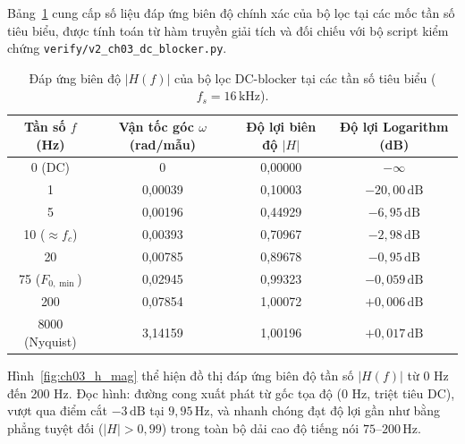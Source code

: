 Bảng~\ref{tab:ch03_h_mag} cung cấp số liệu đáp ứng biên độ chính xác của bộ lọc tại các mốc tần số tiêu biểu, được tính toán từ hàm truyền giải tích và đối chiếu với bộ script kiểm chứng \texttt{verify/v2\_ch03\_dc\_blocker.py}.

\begin{table}[H]
\centering
\small
\caption{Đáp ứng biên độ $|H(f)|$ của bộ lọc DC-blocker tại các tần số tiêu biểu ($f_s = 16\,\text{kHz}$).}
\label{tab:ch03_h_mag}
\begin{tabular}{@{}cccc@{}}
\toprule
Tần số $f$ (Hz) & Vận tốc góc $\omega$ (rad/mẫu) & Độ lợi biên độ $|H|$ & Độ lợi Logarithm (dB) \\
\midrule
0 (DC) & 0 & 0{,}00000 & $-\infty$ \\
1 & 0{,}00039 & 0{,}10003 & $-20{,}00\,\text{dB}$ \\
5 & 0{,}00196 & 0{,}44929 & $-6{,}95\,\text{dB}$ \\
10 ($\approx f_c$) & 0{,}00393 & 0{,}70967 & $-2{,}98\,\text{dB}$ \\
20 & 0{,}00785 & 0{,}89678 & $-0{,}95\,\text{dB}$ \\
75 ($F_{0,\min}$) & 0{,}02945 & 0{,}99323 & $-0{,}059\,\text{dB}$ \\
200 & 0{,}07854 & 1{,}00072 & $+0{,}006\,\text{dB}$ \\
8000 (Nyquist) & 3{,}14159 & 1{,}00196 & $+0{,}017\,\text{dB}$ \\
\bottomrule
\end{tabular}
\end{table}

Hình~\ref{fig:ch03_h_mag} thể hiện đồ thị đáp ứng biên độ tần số $|H(f)|$ từ 0 Hz đến 200 Hz. Đọc hình: đường cong xuất phát từ gốc tọa độ (0 Hz, triệt tiêu DC), vượt qua điểm cắt $-3\,\text{dB}$ tại $9{,}95\,\text{Hz}$, và nhanh chóng đạt độ lợi gần như bằng phẳng tuyệt đối ($|H| > 0{,}99$) trong toàn bộ dải cao độ tiếng nói $75\text{--}200\,\text{Hz}$.

